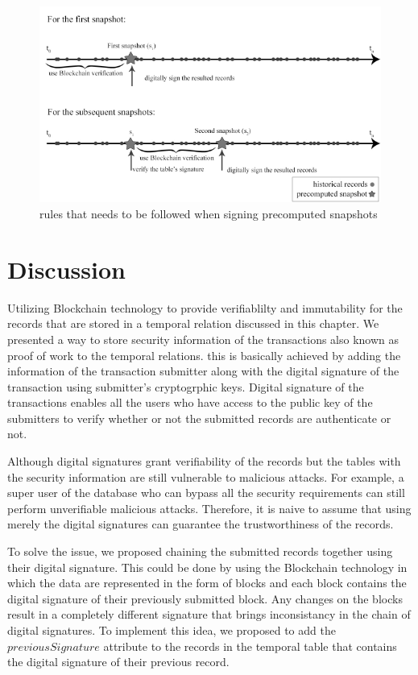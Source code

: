 			\begin{figure}
				\centering
				\includegraphics[width=\textwidth]{figs/signing_snapshots.pdf}
				\caption{rules that needs to be followed when signing precomputed snapshots}
				\label{fig:signing_snapshots}
			\end{figure}



	\section{Discussion} \label{sec:algorithm_discussion}

		Utilizing Blockchain technology to provide verifiablilty and immutability for the records that are stored in a temporal relation  discussed in this chapter. We presented a way to store security information of the transactions also known as proof of work to the temporal relations. this is basically achieved by adding the information of the transaction submitter along with the digital signature of the transaction using submitter's cryptogrphic keys. Digital signature of the transactions enables all the users who have access to the public key of the submitters to verify whether or not the submitted records are authenticate or not.

		Although digital signatures grant verifiability of the records but the tables with the security information are still vulnerable to malicious attacks. For example, a super user of the database who can bypass all the security requirements can still perform unverifiable malicious attacks. Therefore, it is naive to assume that using merely the digital signatures can guarantee the trustworthiness of the records. 
		
		To solve the issue, we proposed chaining the submitted records together using their digital signature. This could be done by using the Blockchain technology in which the data are represented in the form of blocks and each block contains the digital signature of their previously submitted block. Any changes on the blocks result in a completely different signature that brings inconsistancy in the chain of digital signatures. To implement this idea, we proposed to add the $previousSignature$ attribute to the records in the temporal table that contains the digital signature of their previous record.

